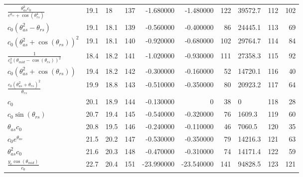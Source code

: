 \begin{tabularx}{\textwidth}{lllrrrrlrr}
$ \displaystyle\frac{\theta_{as}^{3} c_{0}}{e^{\theta_{rs}} + \cos{\left(\theta_{rs}^{4} \right)}} $  &  19.1  &  18\phantom{.0}  &  137  &  -1.680000  &  -1.480000  &  122  &  39572.7  &  112\phantom{.000000}  &  102\phantom{.000000}  \\ 
$ c_{0} \left(\theta_{as}^{2} - \theta_{rs}\right) $  &  19.1  &  18.1  &  139  &  -0.560000  &  -0.400000  &  86  &  24445.1  &  113\phantom{.000000}  &  69\phantom{.000000}  \\ 
$ c_{0} \left(\theta_{as}^{2} + \cos{\left(\theta_{rs} \right)}\right)^{2} $  &  19.1  &  18.1  &  140  &  -0.920000  &  -0.680000  &  102  &  29764.7  &  114\phantom{.000000}  &  84\phantom{.000000}  \\ 
$ \displaystyle\frac{1}{c_{0}^{2} \left(\theta_{mid} - \cos{\left(\theta_{rs} \right)}\right)^{2}} $  &  18.4  &  18.2  &  141  &  -1.020000  &  -0.930000  &  111  &  27358.3  &  115\phantom{.000000}  &  92\phantom{.000000}  \\ 
$ c_{0} \left(\theta_{as}^{2} + \cos{\left(\theta_{rs} \right)}\right) $  &  19.4  &  18.2  &  142  &  -0.300000  &  -0.160000  &  52  &  14720.1  &  116\phantom{.000000}  &  40\phantom{.000000}  \\ 
$ \displaystyle\frac{c_{0} \left(\theta_{as}^{2} + \theta_{rs}\right)^{2}}{\theta_{rs}} $  &  19.9  &  18.8  &  143  &  -0.510000  &  -0.350000  &  80  &  20923.2  &  117\phantom{.000000}  &  64\phantom{.000000}  \\ 
$ c_{0} $  &  20.1  &  18.9  &  144  &  -0.130000  &  0\phantom{.000000}  &  38  &  0\phantom{.0}  &  118\phantom{.000000}  &  28\phantom{.000000}  \\ 
$ c_{0} \sin{\left(\theta_{rs} \right)} $  &  20.7  &  19.4  &  145  &  -0.540000  &  -0.320000  &  76  &  1609.3  &  119\phantom{.000000}  &  60\phantom{.000000}  \\ 
$ \theta_{as} c_{0} $  &  20.8  &  19.5  &  146  &  -0.240000  &  -0.110000  &  46  &  7060.5  &  120\phantom{.000000}  &  35\phantom{.000000}  \\ 
$ c_{0} e^{\theta_{as}} $  &  21.5  &  20.2  &  147  &  -0.530000  &  -0.350000  &  79  &  14216.3  &  121\phantom{.000000}  &  63\phantom{.000000}  \\ 
$ \theta_{as}^{2} c_{0} $  &  21.6  &  20.3  &  148  &  -0.470000  &  -0.310000  &  74  &  14171.4  &  122\phantom{.000000}  &  59\phantom{.000000}  \\ 
$ \displaystyle\frac{y_c \cos{\left(\theta_{mid} \right)}}{c_{0}} $  &  22.7  &  20.4  &  151  &  -23.990000  &  -23.540000  &  141  &  94828.5  &  123\phantom{.000000}  &  121\phantom{.000000}  \\ 

\end{tabularx}
